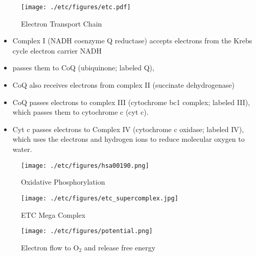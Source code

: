 \documentclass{scrartcl}
\begin{document}
\begin{enumerate}
\begin{figure}[htbp]
\centering
\texttt{[image: ./etc/figures/etc.pdf]}
\caption{\label{fig:org6967747}
Electron Transport Chain}
\end{figure}

\begin{itemize}
\item Complex I (NADH coenzyme Q reductase) accepts electrons from the
Krebs cycle electron carrier NADH
\item passes them to CoQ (ubiquinone; labeled Q),
\item CoQ also receives electrons from complex II (succinate dehydrogenase)
\item CoQ passes electrons to complex III (cytochrome bc1 complex; labeled
III), which passes them to cytochrome c (cyt c).
\item Cyt c passes electrons to Complex IV (cytochrome c oxidase; labeled
IV), which uses the electrons and hydrogen ions to reduce molecular
oxygen to water.
\end{itemize}

\begin{figure}[htbp]
\centering
\texttt{[image: ./etc/figures/hsa00190.png]}
\caption[ETC]{\label{fig:org232a785}
Oxidative Phosphorylation}
\end{figure}

\begin{figure}[htbp]
\centering
\texttt{[image: ./etc/figures/etc\_supercomplex.jpg]}
\caption[ETC mega complex]{\label{fig:org0429c34}
ETC Mega Complex}
\end{figure}

\begin{figure}[htbp]
\centering
\texttt{[image: ./etc/figures/potential.png]}
\caption[redox]{\label{fig:org48eddf6}
Electron flow to O\(_{\text{2}}\) and release free energy}
\end{figure}
\end{enumerate}
\end{document}
